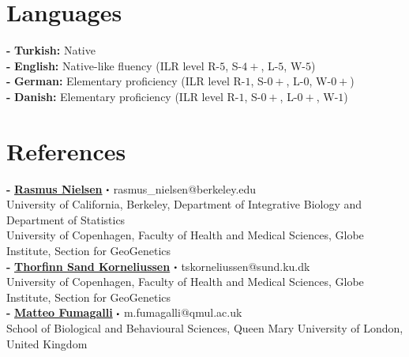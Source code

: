 \documentclass[letterpaper,10.5pt]{article}
\newcommand\sbullet[1][.5]{\mathbin{\vcenter{\hbox{\scalebox{#1}{$\bullet$}}}}}
\begin{document}
 

\section{Languages}
    \textbf{-}  \textbf{Turkish:} Native \\
    \textbf{-}  \textbf{English:} Native-like fluency (ILR level R-$5$, S-$4+$, L-$5$, W-$5$) \\
    \textbf{-}  \textbf{German:} Elementary proficiency (ILR level R-$1$, S-$0+$, L-$0$, W-$0+$) \\
    \textbf{-}  \textbf{Danish:} Elementary proficiency (ILR level R-$1$, S-$0+$, L-$0+$, W-$1$) \\
\vspace{-0.8em}

\section{References}

\textbf{-} \textbf{\href{https://scholar.google.com/citations?user=PySbfcEAAAAJ&hl=en&oi=ao}{Rasmus Nielsen}}  $\sbullet[.5]$ rasmus\_nielsen@berkeley.edu \\
University of California, Berkeley, Department of Integrative Biology and Department of Statistics \\
University of Copenhagen, Faculty of Health and Medical Sciences, Globe Institute, Section for GeoGenetics \\

\textbf{-} \textbf{\href{https://scholar.google.com/citations?hl=en&user=-YNWF4AAAAAJ}{Thorfinn Sand Korneliussen}}   $\sbullet[.5]$ tskorneliussen@sund.ku.dk \\
University of Copenhagen, Faculty of Health and Medical Sciences, Globe Institute, Section for GeoGenetics \\

\textbf{-} \textbf{\href{https://scholar.google.com/citations?hl=en&user=rQhiTmYAAAAJ}{Matteo Fumagalli}}   $\sbullet[.5]$  m.fumagalli@qmul.ac.uk  \\
School of Biological and Behavioural Sciences, Queen Mary University of London, United Kingdom \\
\end{document}
